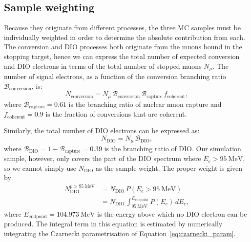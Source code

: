 \subsection{Sample weighting}\label{sec:sample_weighting}

Because they originate from different processes, the three MC samples must be
individually weighted in order to determine the absolute contribution from each.
The conversion and DIO processes both originate from the muons bound in the
stopping target, hence we can express the total number of expected conversion
and DIO electrons in terms of the total number of stopped muons $N_\mu$.
The number of signal electrons, as a function of the conversion branching
ratio $\mathcal{B}_\mathrm{conversion}$, is:
\begin{equation}\label{eq:weight_signal}
N_\mathrm{conversion} = 
N_\mu \, \mathcal{B}_\mathrm{conversion} \, 
\mathcal{B}_\mathrm{capture} \, f_\mathrm{coherent},
\end{equation}
where $\mathcal{B}_\mathrm{capture} = 0.61$ is the branching ratio of nuclear
muon capture and $f_\mathrm{coherent}=0.9$ is the
fraction of conversions that are coherent.

Similarly, the total number of DIO electrons can be expressed as:
$$
N_\mathrm{DIO} = N_\mu \, \mathcal{B}_\mathrm{DIO},
$$
where $\mathcal{B}_\mathrm{DIO} = 1 - \mathcal{B}_\mathrm{capture} = 0.39$ is
the branching ratio of DIO. Our simulation sample, however, only covers the part
of the DIO spectrum where $E_e > \SI{95}{\MeV}$, so we cannot simply use
$N_\mathrm{DIO}$ as the sample weight. The proper weight is given by 
\begin{align}\label{eq:weight_dio}
N_\mathrm{DIO}^{p>\SI{95}{\MeV}} &= N_\mathrm{DIO} \, P(E_e > \SI{95}{\MeV}) \\\nonumber
&= N_\mathrm{DIO}\,\int_{\SI{95}{\MeV}}^{E_\mathrm{endpoint}} P(E_e)\,dE_e,
\end{align}
where $E_\mathrm{endpoint} = \SI{104.973}{\MeV}$ is the energy above which no
DIO electron can be produced. The integral term in this equation is estimated by
numerically integrating the Czarnecki parametrisation of
Equation~\ref{eq:czarnecki_param}.

